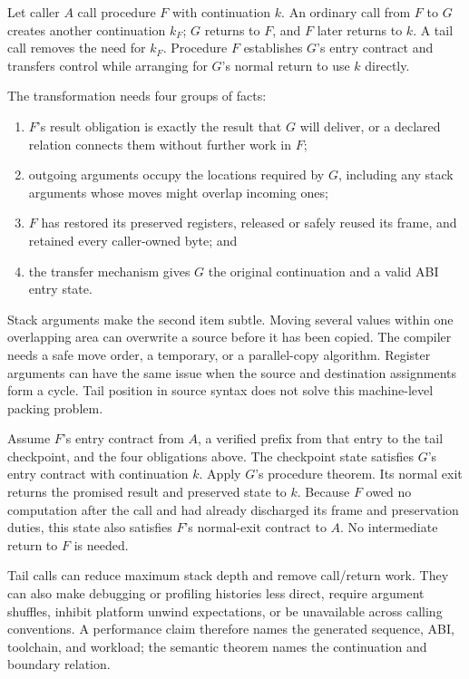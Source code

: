Let caller \(A\) call procedure \(F\) with continuation \(k\). An ordinary
call from \(F\) to \(G\) creates another continuation \(k_F\); \(G\) returns
to \(F\), and \(F\) later returns to \(k\). A tail call removes the need for
\(k_F\). Procedure \(F\) establishes \(G\)'s entry contract and transfers
control while arranging for \(G\)'s normal return to use \(k\) directly.

The transformation needs four groups of facts:

\begin{enumerate}
\item \(F\)'s result obligation is exactly the result that \(G\) will deliver,
or a declared relation connects them without further work in \(F\);
\item outgoing arguments occupy the locations required by \(G\), including
any stack arguments whose moves might overlap incoming ones;
\item \(F\) has restored its preserved registers, released or safely reused
its frame, and retained every caller-owned byte; and
\item the transfer mechanism gives \(G\) the original continuation and a valid
ABI entry state.
\end{enumerate}

Stack arguments make the second item subtle. Moving several values within one
overlapping area can overwrite a source before it has been copied. The compiler
needs a safe move order, a temporary, or a parallel-copy algorithm. Register
arguments can have the same issue when the source and destination assignments
form a cycle. Tail position in source syntax does not solve this machine-level
packing problem.

\begin{proofkit}[title={Tail-call composition}]
Assume \(F\)'s entry contract from \(A\), a verified prefix from that entry to
the tail checkpoint, and the four obligations above. The checkpoint state
satisfies \(G\)'s entry contract with continuation \(k\). Apply \(G\)'s
procedure theorem. Its normal exit returns the promised result and preserved
state to \(k\). Because \(F\) owed no computation after the call and had
already discharged its frame and preservation duties, this state also
satisfies \(F\)'s normal-exit contract to \(A\). No intermediate return to
\(F\) is needed.
\end{proofkit}

Tail calls can reduce maximum stack depth and remove call/return work. They can
also make debugging or profiling histories less direct, require argument
shuffles, inhibit platform unwind expectations, or be unavailable across
calling conventions. A performance claim therefore names the generated
sequence, ABI, toolchain, and workload; the semantic theorem names the
continuation and boundary relation.

